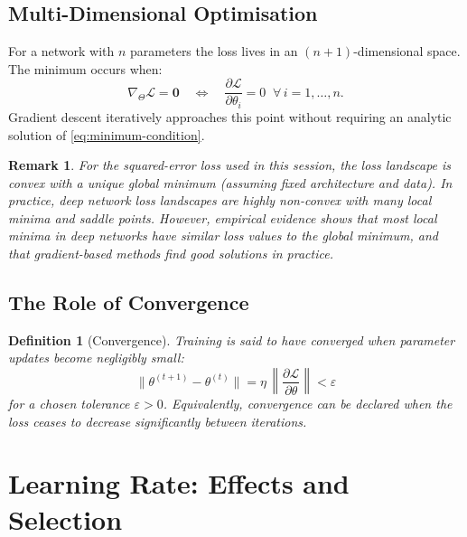 \documentclass[12pt,a4paper]{article}
\newtheorem{definition}{Definition}[section]
\newtheorem{remark}{Remark}[section]
\newcommand{\Loss}{\mathcal{L}}
\newcommand{\pderiv}[2]{\dfrac{\partial #1}{\partial #2}}
\begin{document}
\subsection{Multi-Dimensional Optimisation}

For a network with $n$ parameters the loss lives in an
$(n+1)$-dimensional space.
The minimum occurs when:
\begin{equation}
  \nabla_\Theta \Loss = \mathbf{0}
  \quad\Longleftrightarrow\quad
  \pderiv{\Loss}{\theta_i} = 0 \;\; \forall\, i = 1,\ldots,n.
  \label{eq:minimum-condition}
\end{equation}
Gradient descent iteratively approaches this point without requiring an
analytic solution of \cref{eq:minimum-condition}.

\begin{remark}
\label{rem:convex-vs-nonconvex}
For the squared-error loss used in this session, the loss landscape is
\emph{convex} with a unique global minimum (assuming fixed architecture and
data).
In practice, deep network loss landscapes are highly non-convex with many
local minima and saddle points.
However, empirical evidence shows that most local minima in deep networks
have similar loss values to the global minimum, and that gradient-based
methods find good solutions in practice.
\end{remark}

\subsection{The Role of Convergence}

\begin{definition}[Convergence]
\label{def:convergence}
Training is said to have \emph{converged} when parameter updates become
negligibly small:
\begin{equation}
  \|\theta^{(t+1)} - \theta^{(t)}\|
    = \eta\,\left\|\pderiv{\Loss}{\theta}\right\| < \varepsilon
  \label{eq:convergence}
\end{equation}
for a chosen tolerance $\varepsilon > 0$.
Equivalently, convergence can be declared when the loss ceases to decrease
significantly between iterations.
\end{definition}

\section{Learning Rate: Effects and Selection}
\label{sec:lr}
\end{document}

